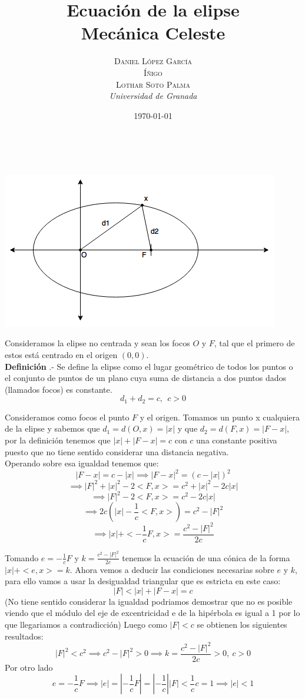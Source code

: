 \documentclass[a4paper, 11pt]{article} %
\title{\textbf{Ecuación de la elipse}\\ %
\vspace{20 pt}
Mecánica Celeste} %
\author{\textsc{Daniel López García\\
Íñigo\\
Lothar Soto Palma} %
\\{\textit{Universidad de Granada}}} %
\date{\today} %
\makeatletter
\renewcommand{\maketitle}{ %
\begin{center} %
{\Huge\@title} %
\end{center}

\vspace{20pt} %

\begin{flushright} %
{\large\@author} %
\\\@date %

\vspace{40pt} %
\end{flushright}
\renewcommand{\baselinestretch}{0.5}

}
\newcounter{ndef}
\makeatother
\begin{document}
	\maketitle
	\begin{center}
		\includegraphics[scale=0.75]{elipse.png} 
	\end{center}	\addtocounter{ndef}{1}
	Consideramos la elipse no centrada y sean los focos $O$ y $F$, tal que el primero de estos está centrado en el origen $(0,0)$.\\ 
	\textbf{Definición }.- Se define la elipse como el lugar geométrico de todos los puntos o el conjunto de puntos de un plano cuya suma de distancia a dos puntos dados (llamados focos) es constante.\\
	$$d_1+d_2 = c, \ \ c>0$$
		
	Consideramos como focos el punto $F$ y el origen. Tomamos un punto x cualquiera de la elipse y sabemos que $d_1 = d(O,x) = |x|$ y que $d_2 = d(F,x) = |F-x|$, por la definición tenemos que $|x|+|F-x|=c$ con $c$ una constante positiva puesto que no tiene sentido considerar una distancia negativa.\\
	Operando sobre esa igualdad tenemos que:\\
	$$|F-x|= c - |x| \implies {|F-x|}^2 = {(c-|x|)}^2 $$ 
	$$\implies  |F|^2+|x|^2-2<F,x> = c^2+|x|^2-2c|x| $$
	$$\implies |F|^2-2<F,x>= c^2 -2c|x| $$
	$$\implies 2c(|x|-\frac{1}{c}<F,x>)= c^2 - |F|^2$$
	$$\implies |x|+<-\frac{1}{c}F,x> = \frac{c^2-|F|^2}{2c}$$
	
	Tomando $e = -\frac{1}{c}F $ y $k = \frac{c^2-|F|^2}{2c}$ tenemos la ecuación de una cónica de la forma $|x|+<e,x>=k$.
	Ahora vemos a deducir las condiciones necesarias sobre $e$ y $k$,
	para ello vamos a usar la desigualdad triangular que es estricta en este caso: \\
	$$|F| < |x| + |F-x| = c $$
	(No tiene sentido considerar la igualdad podriamos demostrar que no es posible viendo que el módulo del eje de excentricidad e de la hipérbola es igual a 1 por lo que llegariamos a contradicción)
	Luego como $|F| < c$ se obtienen los siguientes resultados:
	$$|F|^2 < c^2 \implies c^2-|F|^2>0 \implies k = \frac{c^2-|F|^2}{2c} > 0, \ c>0$$ 
	Por otro lado 
	$$e = -\frac{1}{c}F \implies |e| = |-\frac{1}{c}F| = |-\frac{1}{c}||F| < \frac{1}{c}c = 1 \implies |e|<1$$
	
\end{document}

